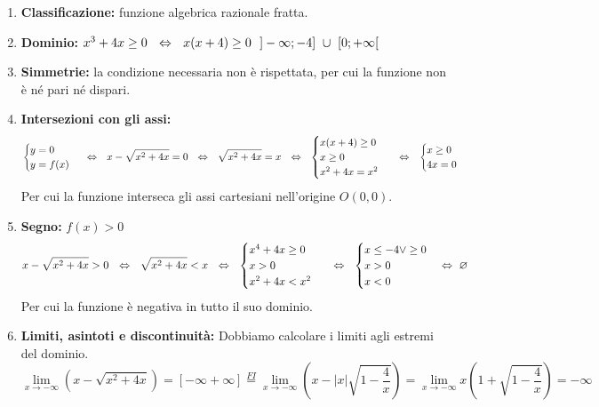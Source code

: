     \begin{ex}
        [Studiare la funzione $y=x-\sqrt{x^2+4x}$, tralasciando la derivata seconda.]
        \begin{enumerate}
            \item \textbf{Classificazione:} funzione algebrica razionale fratta.
            \item \textbf{Dominio:} $x^3+4x\geq 0\ \ \Harr \ \ x(x+4)\geq 0\ \ ]-\infty;-4]\ \cup \ [0;+\infty[$
            \item \textbf{Simmetrie:} la condizione necessaria non è rispettata, per cui la funzione non è né pari né dispari.
            \item \textbf{Intersezioni con gli assi:} 
            \[\begin{cases}
                y=0\\
                y=f(x)
            \end{cases}\ \Harr \ \ x-\sqrt{x^2+4x}=0\ \ \Harr \ \ \sqrt{x^2+4x}=x\ \ \Harr\ \ \begin{cases}
                x(x+4)\geq 0\\
                x\geq 0\\
                x^2+4x=x^2
            \end{cases}\ \ \Harr\ \ \begin{cases}
                x\geq 0\\
                4x=0
            \end{cases}\]
            Per cui la funzione interseca gli assi cartesiani nell'origine $O(0,0)$.
            \item \textbf{Segno: }$f(x)>0$
            \[x-\sqrt{x^2+4x}>0\ \ \Harr\ \  \sqrt{x^2+4x}<x \ \ \Harr \ \ \begin{cases}
                x^4+4x\geq 0\\
                x>0\\
                x^2+4x<x^2
            \end{cases}\ \ \Harr \ \ \begin{cases}
                x\leq -4 \lor \geq 0\\
                x>0\\
                x<0
            \end{cases}\Harr\ \varnothing\]
            Per cui la funzione è negativa in tutto il suo dominio.
            \item \textbf{Limiti, asintoti e discontinuità:} Dobbiamo calcolare i limiti agli estremi del dominio.
            \[\lim_{x\to-\infty}\left( x-\sqrt{x^2+4x} \right)=\left[{-\infty+\infty} \right]\overset{FI}{=}\lim_{x\to -\infty}\left( x-|x|\sqrt{1-\frac{4}{x}} \right)=\lim_{x\to -\infty}x\left( 1+\sqrt{1-\frac{4}{x}}\right)=-\infty\]

\end{enumerate}
\end{ex}
